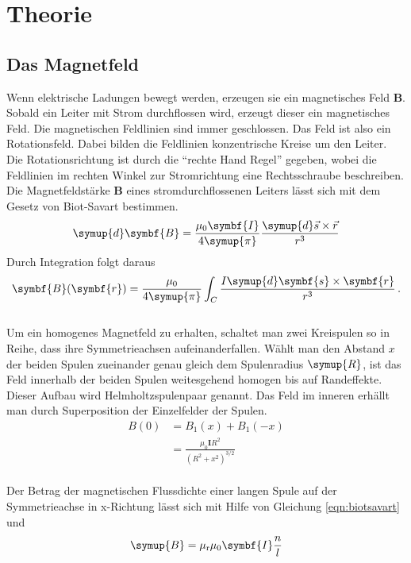 \section{Theorie}
\label{sec:theorie}
\subsection{Das Magnetfeld}
Wenn elektrische Ladungen bewegt werden, erzeugen sie ein magnetisches Feld
$\symbf{B}$.
Sobald ein Leiter mit Strom durchflossen wird, erzeugt dieser ein magnetisches
Feld. Die magnetischen Feldlinien sind immer geschlossen. Das Feld ist also ein
Rotationsfeld. Dabei bilden die Feldlinien konzentrische Kreise um den Leiter.
Die Rotationsrichtung ist durch die \enquote{rechte Hand Regel} gegeben, wobei
die Feldlinien im rechten Winkel zur Stromrichtung eine Rechtsschraube
beschreiben.
Die Magnetfeldstärke $\symbf{B}$ eines stromdurchflossenen Leiters lässt
sich mit dem Gesetz von Biot-Savart bestimmen.
\begin{equation}
  \symup{d}\symbf{B} =
  \frac{\mu_0 \symbf{I}}{4 \symup{\pi}}
  \frac{\symup{d}\vec{s} \times \vec{r}}{r^3}
\label{eqn:biotleiter}
\end{equation}
Durch Integration folgt daraus
\begin{equation}
  \symbf{B}(\symbf{r}) = \frac{\mu_0}{4 \symup{\pi}}
    \int_C \frac{I \symup{d} \symbf{s} \times \symbf{r}}{r^3}\,.
  \label{eqn:biotsavart}
\end{equation}
\\
Um ein homogenes Magnetfeld zu erhalten, schaltet man zwei Kreispulen so in
Reihe, dass ihre Symmetrieachsen aufeinanderfallen. Wählt man den Abstand $x$
der beiden Spulen zueinander genau gleich dem Spulenradius $\symup{R}$, ist das Feld
innerhalb der beiden Spulen weitesgehend homogen bis auf Randeffekte.
Dieser Aufbau wird Helmholtzspulenpaar genannt.
Das Feld im inneren erhällt man durch Superposition der Einzelfelder der Spulen.
\begin{align}
  B(0) &= B_1(x) + B_1(-x) \\
       &= \frac{\mu_0 \symbf{I} R^2}{\left(R^2 +x^2\right)^{3/2}}
\end{align}
\\
Der Betrag der magnetischen Flussdichte einer langen Spule auf der
Symmetrieachse in x-Richtung lässt sich mit Hilfe von Gleichung
\eqref{eqn:biotsavart} und
\begin{equation}
  \symup{B} = \mu_\text{r} \mu_0 \symbf{I} \frac{n}{l}
\end{equation}
